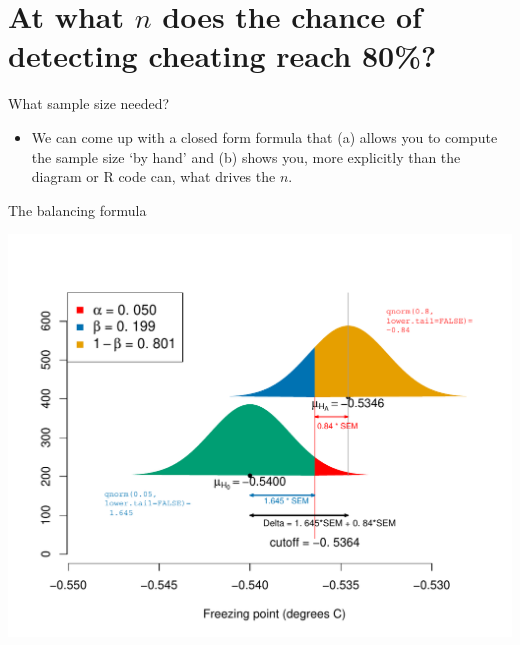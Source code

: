 \documentclass[10pt]{beamer}\usepackage[]{graphicx}\usepackage[]{color}
\makeatletter
\def\maxwidth{ %
  \ifdim\Gin@nat@width>\linewidth
    \linewidth
  \else
    \Gin@nat@width
  \fi
}
\newenvironment{knitrout}{}{} %
\makeatother
\begin{document}
\section{At what $n$ does the chance of detecting cheating reach 80\%?}

\begin{frame}{What sample size needed?}
	
	\begin{itemize}
		\item We can come up with a closed form formula that (a) allows you to compute the sample size `by hand' and (b) shows you, more explicitly than the diagram or R code can, what drives the $n$.
		
	\end{itemize}
	
\end{frame}

\begin{frame}[fragile]{The balancing formula}
\begin{knitrout}\tiny
{}\color{fgcolor}

{\centering \includegraphics[width=\maxwidth]{figure/unnamed-chunk-14-1} 

}



\end{knitrout}
\end{frame}
\end{document}
